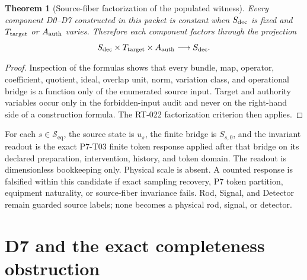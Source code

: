 \documentclass[11pt]{article}
\newtheorem{theorem}{Theorem}
\newcommand{\Sectors}{\mathcal S_{\mathrm{eq}}}
\begin{document}
\begin{theorem}[Source-fiber factorization of the populated witness]
\label{thm:fiber}
Every component D0--D7 constructed in this packet is constant when
\(S_{\rm dec}\) is fixed and \(T_{\rm target}\) or \(A_{\rm auth}\) varies.
Therefore each component factors through the projection
\[
 S_{\rm dec}\times T_{\rm target}\times A_{\rm auth}
 \longrightarrow S_{\rm dec}.
\]
\end{theorem}

\begin{proof}
Inspection of the formulas shows that every bundle, map, operator,
coefficient, quotient, ideal, overlap unit, norm, variation class, and
operational bridge is a function only of the enumerated source input. Target
and authority variables occur only in the forbidden-input audit and never on
the right-hand side of a construction formula. The RT-022 factorization
criterion then applies.
\end{proof}

For each \(s\in\Sectors\), the source state is \(u_s\), the finite bridge is
\(S_{s,0}\), and the invariant readout is the exact P7-T03 finite token
response applied after that bridge on its declared preparation, intervention,
history, and token domain. The readout is dimensionless bookkeeping only.
Physical scale is absent. A counted response is falsified within this
candidate if exact sampling recovery, P7 token partition, equipment
naturality, or source-fiber invariance fails. Rod, Signal, and Detector remain
guarded source labels; none becomes a physical rod, signal, or detector.

\section{D7 and the exact completeness obstruction}
\end{document}
